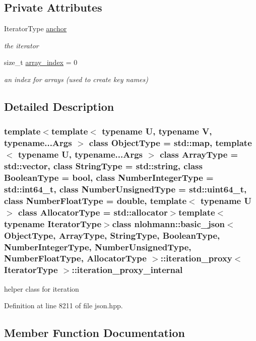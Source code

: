\subsection*{Private Attributes}
\begin{DoxyCompactItemize}
\item 
Iterator\+Type \hyperlink{classnlohmann_1_1basic__json_1_1iteration__proxy_1_1iteration__proxy__internal_a7b2f75557da51e1e90de0085e8578217}{anchor}
\begin{DoxyCompactList}\small\item\em the iterator \end{DoxyCompactList}\item 
size\+\_\+t \hyperlink{classnlohmann_1_1basic__json_1_1iteration__proxy_1_1iteration__proxy__internal_a34fbf864472f7b7f8a7513fe08d87311}{array\+\_\+index} = 0
\begin{DoxyCompactList}\small\item\em an index for arrays (used to create key names) \end{DoxyCompactList}\end{DoxyCompactItemize}


\subsection{Detailed Description}
\subsubsection*{template$<$template$<$ typename U, typename V, typename...\+Args $>$ class Object\+Type = std\+::map, template$<$ typename U, typename...\+Args $>$ class Array\+Type = std\+::vector, class String\+Type = std\+::string, class Boolean\+Type = bool, class Number\+Integer\+Type = std\+::int64\+\_\+t, class Number\+Unsigned\+Type = std\+::uint64\+\_\+t, class Number\+Float\+Type = double, template$<$ typename U $>$ class Allocator\+Type = std\+::allocator$>$template$<$typename Iterator\+Type$>$class nlohmann\+::basic\+\_\+json$<$ Object\+Type, Array\+Type, String\+Type, Boolean\+Type, Number\+Integer\+Type, Number\+Unsigned\+Type, Number\+Float\+Type, Allocator\+Type $>$\+::iteration\+\_\+proxy$<$ Iterator\+Type $>$\+::iteration\+\_\+proxy\+\_\+internal}

helper class for iteration 

Definition at line 8211 of file json.\+hpp.



\subsection{Member Function Documentation}
\hypertarget{classnlohmann_1_1basic__json_1_1iteration__proxy_1_1iteration__proxy__internal_a4a63c02623695c749b69eedcb383894c}{}

